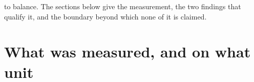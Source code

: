 to balance. The sections below give the
measurement, the two findings that qualify it, and the boundary beyond which none of it is claimed.

\section{What was measured, and on what unit}
\label{apx:cosine:setup}

